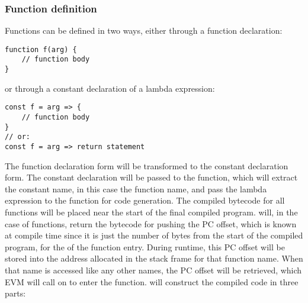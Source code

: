 \subsubsection{Function definition}
Functions can be defined in two ways, either through a function declaration: 
\begin{verbatim}
function f(arg) {
    // function body
}
\end{verbatim}
or through a constant declaration of a lambda expression: 
\begin{verbatim}
const f = arg => {
    // function body
}
// or: 
const f = arg => return statement
\end{verbatim}
The function declaration form will be transformed to the constant declaration form. The constant declaration will be passed to the  function, which will extract the constant name, in this case the function name, and pass the lambda expression to the  function for code generation. The compiled bytecode for all functions will be placed near the start of the final compiled program.  will, in the case of functions, return the bytecode for pushing the PC offset, which is known at compile time since it is just the number of bytes from the start of the compiled program, for the  of the function entry. During runtime, this PC offset will be stored into the address allocated in the stack frame for that function name. When that name is accessed like any other names, the PC offset will be retrieved, which EVM will call  on to enter the function.
\newpage
{} will construct the compiled code in three parts: 
